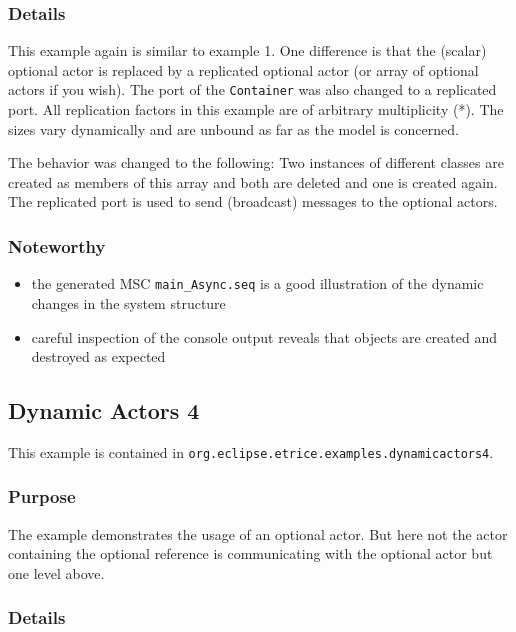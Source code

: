 \subsubsection{Details}

This example again is similar to example 1. One difference is that the (scalar) optional actor is replaced by a
replicated optional actor (or array of optional actors if you wish).
The port of the \texttt{Container} was also changed to a replicated port. All replication factors in this example
are of arbitrary multiplicity (*). The sizes vary dynamically and are unbound as far as the model is concerned.

The behavior was changed to the following:
Two instances of different classes are created as members of this array and both are deleted and one is created again.
The replicated port is used to send (broadcast) messages to the optional actors.

\subsubsection{Noteworthy}

\begin{itemize}
\item the generated MSC \texttt{main\_Async.seq} is a good illustration of the dynamic changes in the system structure
\item careful inspection of the console output reveals that objects are created and destroyed as expected
\end{itemize}

\subsection{Dynamic Actors 4}

This example is contained in \texttt{org.eclipse.etrice.examples.dynamicactors4}.

\subsubsection{Purpose}

The example demonstrates the usage of an optional actor. But here not the actor containing the optional reference
is communicating with the optional actor but one level above.

\subsubsection{Details}

